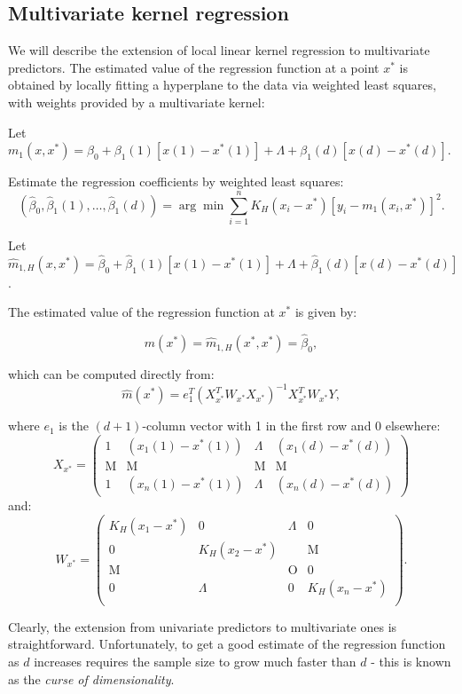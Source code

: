 \subsection{Multivariate kernel regression}
We will describe the extension of local linear kernel regression to multivariate predictors. The estimated value of the regression function at a point $x^*$ is obtained by locally fitting a hyperplane to the data via weighted least squares, with weights provided by a multivariate kernel:
\begin{asparaenum}[(a)]
\item Let $m_1(x,x^*)=\beta_0+\beta_1(1)[x(1)-x^*(1)]+\Lambda+\beta_1(d)[x(d)-x^*(d)]$.

\item Estimate the regression coefficients by weighted least squares:
$$(\hat{\beta}_0,\hat{\beta}_1(1),\ldots,\hat{\beta}_1(d))=\arg\min\sum^n_{i=1}K_H(x_i-x^*)[y_i-m_1(x_i,x^*)]^2.$$

\item Let $\hat{m}_{1,H}(x,x^*)=\hat{\beta}_0+\hat{\beta}_1(1)[x(1)-x^*(1)]+\Lambda+\hat{\beta}_1(d)[x(d)-x^*(d)]$.

\item The estimated value of the regression function at $x^*$ is given by:

$$\hat{m}(x^*)=\hat{m}_{1,H}(x^*,x^*)=\hat{\beta}_0,$$

which can be computed directly from:
$$\hat{m}(x^*)=e_1^T(X^T_{x^*}W_{x^*}X_{x^*})^{-1}X^T_{x^*}W_{x^*}Y,$$

where $e_1$ is the $(d + 1)$-column vector with 1 in the first row and 0 elsewhere:
$$X_{x^*}=\left(\begin{array}{cccc}1&(x_1(1)-x^*(1))&\Lambda &(x_1(d)-x^*(d))\\\textrm{M}&\textrm{M}&\textrm{M}&\textrm{M}\\1&(x_n(1)-x^*(1))&\Lambda &(x_n(d)-x^*(d))
\end{array}\right)$$
and:
$$W_{x^*}=\left(\begin{array}{cccc}
K_H(x_1-x^*)&0&\Lambda&0\\
0&K_H(x_2-x^*)&&\textrm{M}\\
\textrm{M}&&\textrm{O}&0\\
0&\Lambda&0&K_H(x_n-x^*)\\
\end{array}\right).$$
\end{asparaenum}
Clearly, the extension from univariate predictors to multivariate ones is straightforward. Unfortunately, to get a good estimate of the regression function as $d$ increases requires the sample size to grow much faster than $d$ - this is known as the {\it curse of dimensionality}.


